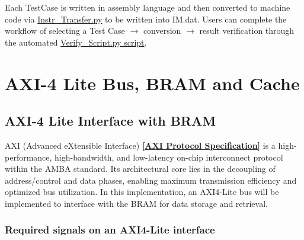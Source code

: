 \documentclass[12pt,a4paper]{report}
\begin{document}
Each TestCase is written in assembly language and then converted to machine code via \href{https://github.com/akira2963753/riscv-fpga/blob/main/five-stage-example/Pattern/Instr_Transfer.py}{Instr\_Transfer.py} to be written into IM.dat. Users can complete the workflow of selecting a Test Case $\rightarrow$ conversion $\rightarrow$ result verification through the automated \href{https://github.com/akira2963753/riscv-fpga/blob/main/five-stage-example/Verify_Script.py}{Verify\_Script.py script}.

\chapter{AXI-4 Lite Bus, BRAM and Cache}

\newpage

\section{AXI-4 Lite Interface with BRAM}
AXI (Advanced eXtensible Interface) \href{https://developer.arm.com/documentation/ihi0022/latest/}{ \textbf{[AXI Protocol Specification]}} is a high-performance, high-bandwidth, and low-latency on-chip interconnect protocol within the AMBA standard. Its architectural core lies in the decoupling of address/control and data phases, enabling maximum transmission efficiency and optimized bus utilization. In this implementation, an AXI4-Lite bus will be implemented to interface with the BRAM for data storage and retrieval.

\subsection{Required signals on an AXI4-Lite interface}
\end{document}

